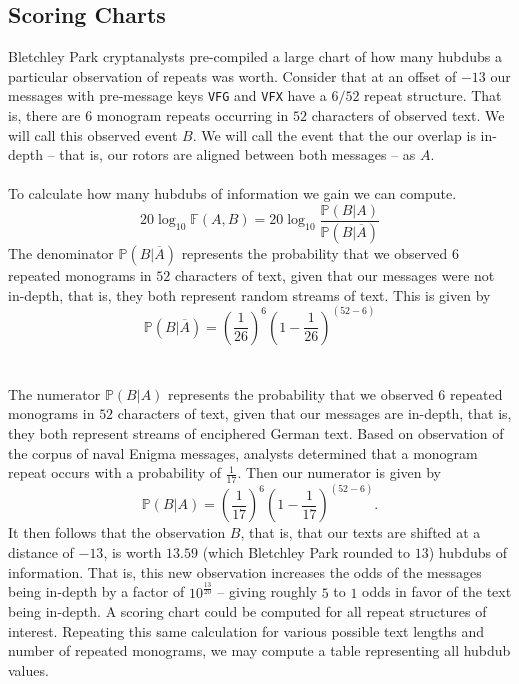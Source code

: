 \subsection{Scoring Charts}
Bletchley Park cryptanalysts pre-compiled a large chart of how many
hubdubs a particular observation of repeats was worth. Consider that
at an offset of $-13$ our messages with
pre-message keys \texttt{VFG} and \texttt{VFX} have a $6/52$ repeat
structure. That is, there are $6$ monogram repeats occurring in $52$
characters of observed text. We will call this observed event $B$.
We will call the event that the our overlap is in-depth -- that is,
our rotors are aligned between both messages -- as $A$.
\\\\To calculate how many hubdubs of information we gain we can compute.
\[
  20\log_{10}\mathbb{F}(A,B) =
  20\log_{10}\frac{\mathbb{P}(B|A)}{\mathbb{P}(B|\overline{A})}
\]
The denominator $\mathbb{P}(B|\overline{A})$ represents the
probability that we observed $6$ repeated monograms in $52$
characters of text, given that our messages were not in-depth, that
is, they both represent random streams of text. This is given by
\[
  \mathbb{P}(B|\overline{A}) = (\frac{1}{26})^6(1-\frac{1}{26})^{(52-6)}
\]
\\\\The numerator $\mathbb{P}(B|{A})$ represents the
probability that we observed $6$ repeated monograms in $52$
characters of text, given that our messages are in-depth, that is,
they both represent streams of enciphered German text. Based on observation of
the corpus of naval Enigma messages, analysts determined that a
monogram repeat occurs with a probability of $\frac{1}{17}$. Then
our numerator is given by
\[
  \mathbb{P}(B|A) = (\frac{1}{17})^6(1-\frac{1}{17})^{(52-6)}.
\]
It then follows that the observation $B$, that is, that our texts
are shifted at a distance of $-13$, is worth $13.59$ (which
Bletchley Park rounded to $13$) hubdubs of information. That is,
this new observation increases the odds of the messages being
in-depth by a factor of $10^\frac{13}{20}$ -- giving roughly $5$
to $1$ odds in favor of the text being in-depth. A scoring chart
could be computed for all repeat structures of interest. Repeating
this same calculation for various possible text lengths and number
of repeated monograms, we may compute a table representing all hubdub values.
